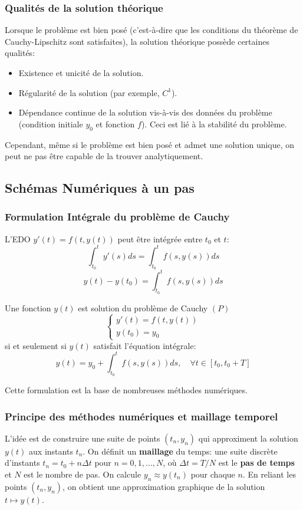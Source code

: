 \subsubsection{Qualités de la solution théorique}
\label{sssec:qualites_solution}
Lorsque le problème est bien posé (c'est-à-dire que les conditions du théorème de Cauchy-Lipschitz sont satisfaites), la solution théorique possède certaines qualités:
\begin{itemize}
    \item Existence et unicité de la solution.
    \item Régularité de la solution (par exemple, $C^1$).
    \item Dépendance continue de la solution vis-à-vis des données du problème (condition initiale $y_0$ et fonction $f$). Ceci est lié à la stabilité du problème.
\end{itemize}
Cependant, même si le problème est bien posé et admet une solution unique, on peut ne pas être capable de la trouver analytiquement.

\subsection{Schémas Numériques à un pas}
\label{ssec:schemas_numeriques}

\subsubsection{Formulation Intégrale du problème de Cauchy}
\label{sssec:formulation_integrale_cauchy}
L'EDO $y'(t) = f(t, y(t))$ peut être intégrée entre $t_0$ et $t$:
\[ \int_{t_0}^t y'(s) ds = \int_{t_0}^t f(s, y(s)) ds \]
\[ y(t) - y(t_0) = \int_{t_0}^t f(s, y(s)) ds \]
\begin{proposition}
Une fonction $y(t)$ est solution du problème de Cauchy $(P)$
\[ \begin{cases} y'(t) = f(t, y(t)) \\ y(t_0) = y_0 \end{cases} \]
si et seulement si $y(t)$ satisfait l'équation intégrale:
\[ y(t) = y_0 + \int_{t_0}^t f(s, y(s)) ds, \quad \forall t \in [t_0, t_0+T] \]
\end{proposition}
Cette formulation est la base de nombreuses méthodes numériques.

\subsubsection{Principe des méthodes numériques et maillage temporel}
\label{sssec:principe_methodes_numeriques}
L'idée est de construire une suite de points $(t_n, y_n)$ qui approximent la solution $y(t)$ aux instants $t_n$.
On définit un \textbf{maillage} du temps: une suite discrète d'instants $t_n = t_0 + n \Delta t$ pour $n=0, 1, \dots, N$, où $\Delta t = T/N$ est le \textbf{pas de temps} et $N$ est le nombre de pas.
On calcule $y_n \approx y(t_n)$ pour chaque $n$. En reliant les points $(t_n, y_n)$, on obtient une approximation graphique de la solution $t \mapsto y(t)$.

